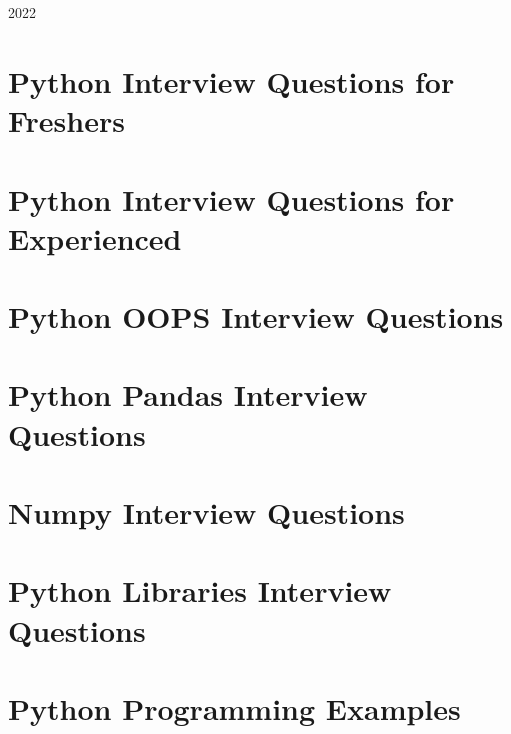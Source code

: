 \documentclass[a4paper, 11pt]{article}
\title{}
\begin{document}
	\begin{titlepage}
		\\
		
		\vspace{10mm}
		\\
		\vspace{\fill}
		\centering \large{2022}
	\end{titlepage}
	
	
	\newpage
	
	\tableofcontents
	\newpage
	
	\section{Python Interview Questions for Freshers}
	
	\newpage
	\section{Python Interview Questions for Experienced}
	
	\newpage
	\section{Python OOPS Interview Questions}
	
	\newpage
	\section{Python Pandas Interview Questions}
	
	\newpage
	\section{Numpy Interview Questions}
	
	\newpage
	\section{Python Libraries Interview Questions}
	
	\newpage
	\section{Python Programming Examples}
	
	\newpage
	
	\pagebreak
	
	
	
\end{document}
